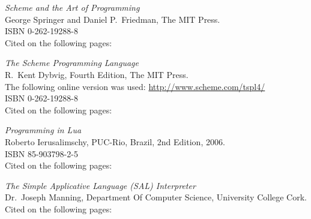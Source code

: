 \begin{thebibliography}{9}

  \emph{Scheme and the Art of Programming}\\
  George Springer and Daniel P.\ Friedman,
  The MIT Press.\\
  ISBN 0-262-19288-8\\
  Cited on the following pages: 

  \emph{The Scheme Programming Language}\\
  R.\ Kent Dybvig,
  Fourth Edition,
  The MIT Press.\\
  The following online version was used: \url{http://www.scheme.com/tspl4/}\\
  ISBN 0-262-19288-8\\
  Cited on the following pages: 

  \emph{Programming in Lua}\\
  Roberto Ierusalimschy,
  PUC-Rio, Brazil,
  2nd Edition,
  2006.\\
  ISBN 85-903798-2-5\\
  Cited on the following pages: 
  
  \emph{The Simple Applicative Language (SAL) Interpreter}\\
  Dr.\ Joseph Manning,
  Department Of Computer Science,
  University College Cork.\\
  Cited on the following pages: 
  
\end{thebibliography}
